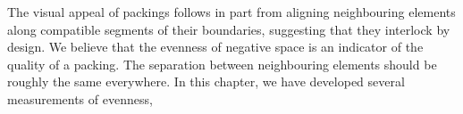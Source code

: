 The visual appeal of packings follows in part from aligning neighbouring elements along compatible 
segments of their boundaries, suggesting that they interlock by design. 
We believe that the evenness of negative space is an indicator 
of the quality of a packing.
The separation between neighbouring elements should be roughly the same everywhere.
In this chapter, we have developed several measurements of evenness,

